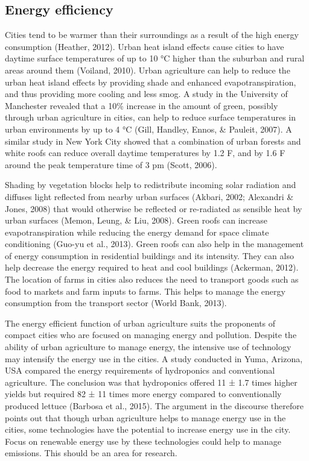 \subsection{Energy efficiency}

Cities tend to be warmer than their surroundings as a result of the high energy consumption (Heather, 2012). Urban heat island effects cause cities to have daytime surface temperatures of up to 10 °C higher than the suburban and rural areas around them (Voiland, 2010). Urban agriculture can help to reduce the urban heat island effects by providing shade and enhanced evapotranspiration, and thus providing more cooling and less smog. A study in the University of Manchester revealed that a 10\% increase in the amount of green, possibly through urban agriculture in cities, can help to reduce surface temperatures in urban environments by up to 4 °C (Gill, Handley, Ennos, \& Pauleit, 2007). A similar study in New York City showed that a combination of urban forests and white roofs can reduce overall daytime temperatures by 1.2 F, and by 1.6 F around the peak temperature time of 3 pm (Scott, 2006).

Shading by vegetation blocks help to redistribute incoming solar radiation and diffuses light reflected from nearby urban surfaces (Akbari, 2002; Alexandri \& Jones, 2008) that would otherwise be reflected or re-radiated as sensible heat by urban surfaces (Memon, Leung, \& Liu, 2008). Green roofs can increase evapotranspiration while reducing the energy demand for space climate conditioning (Guo-yu et al., 2013). Green roofs can also help in the management of energy consumption in residential buildings and its intensity. They can also help decrease the energy required to heat and cool buildings (Ackerman, 2012). The location of farms in cities also reduces the need to transport goods such as food to markets and farm inputs to farms. This helps to manage the energy consumption from the transport sector (World Bank, 2013).

The energy efficient function of urban agriculture suits the proponents of compact cities who are focused on managing energy and pollution. Despite the ability of urban agriculture to manage energy, the intensive use of technology may intensify the energy use in the cities. A study conducted in Yuma, Arizona, USA compared the energy requirements of hydroponics and conventional agriculture. The conclusion was that hydroponics offered 11 ± 1.7 times higher yields but required 82 ± 11 times more energy compared to conventionally produced lettuce (Barbosa et al., 2015). The argument in the discourse therefore points out that though urban agriculture helps to manage energy use in the cities, some technologies have the potential to increase energy use in the city. Focus on renewable energy use by these technologies could help to manage emissions. This should be an area for research.

